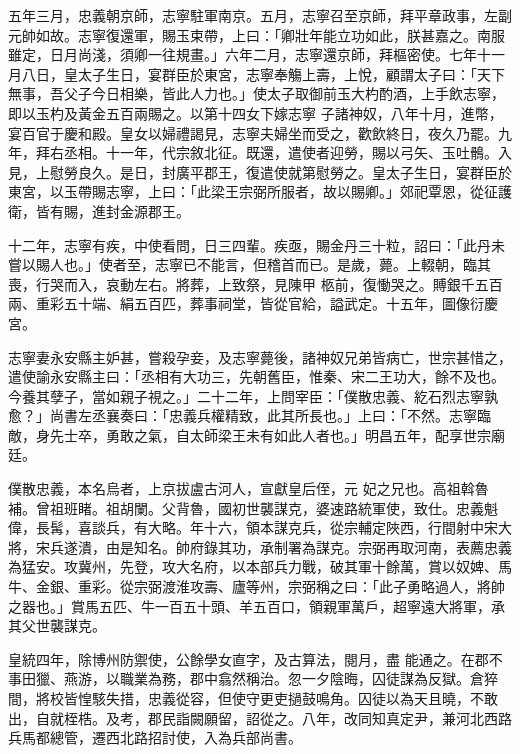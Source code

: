 \begin{pinyinscope}
 五年三月，忠義朝京師，志寧駐軍南京。五月，志寧召至京師，拜平章政事，左副元帥如故。志寧復還軍，賜玉束帶，上曰：「卿壯年能立功如此，朕甚嘉之。南服雖定，日月尚淺，須卿一往規畫。」六年二月，志寧還京師，拜樞密使。七年十一月八日，皇太子生日，宴群臣於東宮，志寧奉觴上壽，上悅，顧謂太子曰：「天下無事，吾父子今日相樂，皆此人力也。」使太子取御前玉大杓酌酒，上手飲志寧，即以玉杓及黃金五百兩賜之。以第十四女下嫁志寧
 子諸神奴，八年十月，進幣，宴百官于慶和殿。皇女以婦禮謁見，志寧夫婦坐而受之，歡飲終日，夜久乃罷。九年，拜右丞相。十一年，代宗敘北征。既還，遣使者迎勞，賜以弓矢、玉吐鶻。入見，上慰勞良久。是日，封廣平郡王，復遣使就第慰勞之。皇太子生日，宴群臣於東宮，以玉帶賜志寧，上曰：「此梁王宗弼所服者，故以賜卿。」郊祀覃恩，從征護衛，皆有賜，進封金源郡王。



 十二年，志寧有疾，中使看問，日三四輩。疾亟，賜金丹三十粒，詔曰：「此丹未嘗以賜人也。」使者至，志寧已不能言，但稽首而已。是歲，薨。上輟朝，臨其喪，行哭而入，哀動左右。將葬，上致祭，見陳甲
 柩前，復慟哭之。賻銀千五百兩、重彩五十端、絹五百匹，葬事祠堂，皆從官給，謚武定。十五年，圖像衍慶宮。



 志寧妻永安縣主妒甚，嘗殺孕妾，及志寧薨後，諸神奴兄弟皆病亡，世宗甚惜之，遣使諭永安縣主曰：「丞相有大功三，先朝舊臣，惟秦、宋二王功大，餘不及也。今養其孽子，當如親子視之。」二十二年，上問宰臣：「僕散忠義、紇石烈志寧孰愈？」尚書左丞襄奏曰：「忠義兵權精致，此其所長也。」上曰：「不然。志寧臨敵，身先士卒，勇敢之氣，自太師梁王未有如此人者也。」明昌五年，配享世宗廟廷。



 僕散忠義，本名烏者，上京拔盧古河人，宣獻皇后侄，元
 妃之兄也。高祖斡魯補。曾祖班睹。祖胡闌。父背魯，國初世襲謀克，婆速路統軍使，致仕。忠義魁偉，長髯，喜談兵，有大略。年十六，領本謀克兵，從宗輔定陜西，行間射中宋大將，宋兵遂潰，由是知名。帥府錄其功，承制署為謀克。宗弼再取河南，表薦忠義為猛安。攻冀州，先登，攻大名府，以本部兵力戰，破其軍十餘萬，賞以奴婢、馬牛、金銀、重彩。從宗弼渡淮攻壽、廬等州，宗弼稱之曰：「此子勇略過人，將帥之器也。」賞馬五匹、牛一百五十頭、羊五百口，領親軍萬戶，超寧遠大將軍，承其父世襲謀克。



 皇統四年，除博州防禦使，公餘學女直字，及古算法，閱月，盡
 能通之。在郡不事田獵、燕游，以職業為務，郡中翕然稱治。忽一夕陰晦，囚徒謀為反獄。倉猝間，將校皆惶駭失措，忠義從容，但使守更吏撾鼓鳴角。囚徒以為天且曉，不敢出，自就桎梏。及考，郡民詣闕願留，詔從之。八年，改同知真定尹，兼河北西路兵馬都總管，遷西北路招討使，入為兵部尚書。




\end{pinyinscope}
